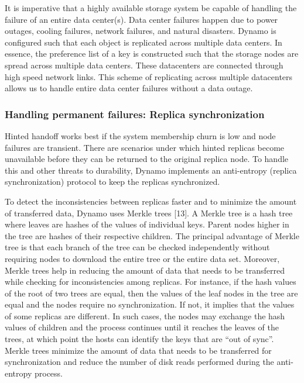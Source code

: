 It is imperative that a highly available storage system be capable
of handling the failure of an entire data center(s). Data center
failures happen due to power outages, cooling failures, network
failures, and natural disasters. Dynamo is configured such that
each object is replicated across multiple data centers. In essence,
the preference list of a key is constructed such that the storage
nodes are spread across multiple data centers. These datacenters
are connected through high speed network links. This scheme of
replicating across multiple datacenters allows us to handle entire
data center failures without a data outage. 

\subsubsection{Handling permanent failures: Replica synchronization}

Hinted handoff works best if the system membership churn is low
and node failures are transient. There are scenarios under which
hinted replicas become unavailable before they can be returned to 
the original replica node. To handle this and other threats to
durability, Dynamo implements an anti-entropy (replica
synchronization) protocol to keep the replicas synchronized. 

To detect the inconsistencies between replicas faster and to
minimize the amount of transferred data, Dynamo uses Merkle
trees [13]. A Merkle tree is a hash tree where leaves are hashes of
the values of individual keys. Parent nodes higher in the tree are
hashes of their respective children. The principal advantage of
Merkle tree is that each branch of the tree can be checked
independently without requiring nodes to download the entire tree
or the entire data set. Moreover, Merkle trees help in reducing the
amount of data that needs to be transferred while checking for
inconsistencies among replicas. For instance, if the hash values of
the root of two trees are equal, then the values of the leaf nodes in
the tree are equal and the nodes require no synchronization. If not,
it implies that the values of some replicas are different. In such
cases, the nodes may exchange the hash values of children and the
process continues until it reaches the leaves of the trees, at which
point the hosts can identify the keys that are “out of sync”. Merkle
trees minimize the amount of data that needs to be transferred for
synchronization and reduce the number of disk reads performed
during the anti-entropy process.

